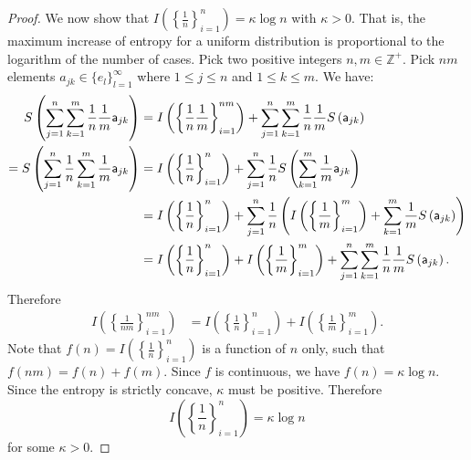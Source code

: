 \begin{proof}
	We now show that $I\left(\left\{\frac{1}{n}\right\}_{i=1}^{n}\right) = \kappa \log n$ with $\kappa > 0$. That is, the maximum increase of entropy for a uniform distribution is proportional to the logarithm of the number of cases. Pick two positive integers $n, m \in \mathbb{Z}^+$. Pick $nm$ elements $a_{jk} \in \{e_l\}_{l=1}^{\infty}$ where $1\leq j \leq n$ and $1 \leq  k \leq m$. We have:
	\begin{equation}
		\begin{aligned}
			S\left(\sum_{j=1}^{n}\sum_{k=1}^{m} \frac{1}{n}\frac{1}{m} \ens[a]_{jk}\right) &= I\left(\left\{ \frac{1}{n}\frac{1}{m}\right\}_{i=1}^{nm}\right) + \sum_{j=1}^{n}\sum_{k=1}^{m} \frac{1}{n}\frac{1}{m} S\left(\ens[a]_{jk}\right) \\
			= S\left(\sum_{j=1}^{n} \frac{1}{n} \sum_{k=1}^{m} \frac{1}{m} \ens[a]_{jk}\right)  &=I\left(\left\{ \frac{1}{n}\right\}_{i=1}^{n}\right) + \sum_{j=1}^{n} \frac{1}{n} S\left(\sum_{k=1}^{m}\frac{1}{m}\ens[a]_{jk}\right) \\
			&=I\left(\left\{ \frac{1}{n}\right\}_{i=1}^{n}\right) + \sum_{j=1}^{n} \frac{1}{n}\left(I\left(\left\{ \frac{1}{m}\right\}_{i=1}^{m}\right) +  \sum_{k=1}^{m}\frac{1}{m}S\left(\ens[a]_{jk}\right)\right) \\
			&=I\left(\left\{ \frac{1}{n}\right\}_{i=1}^{n}\right) + I\left(\left\{ \frac{1}{m}\right\}_{i=1}^{m}\right) + \sum_{j=1}^{n} \sum_{k=1}^{m}\frac{1}{n}\frac{1}{m}S\left(\ens[a]_{jk}\right).
		\end{aligned}
	\end{equation}
	Therefore
	\begin{equation}
		\begin{aligned}
			I\left(\left\{ \frac{1}{nm}\right\}_{i=1}^{nm}\right) &=I\left(\left\{ \frac{1}{n}\right\}_{i=1}^{n}\right) + I\left(\left\{ \frac{1}{m}\right\}_{i=1}^{m}\right).
		\end{aligned}
	\end{equation}
	Note that $f(n) = I\left(\left\{ \frac{1}{n}\right\}_{i=1}^{n}\right)$ is a function of $n$ only, such that $f(nm) = f(n) + f(m)$. Since $f$ is continuous, we have $f(n) = \kappa \log n$. Since the entropy is strictly concave, $\kappa$ must be positive. Therefore
	\begin{equation}
		I\left(\left\{ \frac{1}{n}\right\}_{i=1}^{n}\right) = \kappa \log n
	\end{equation}
	for some $\kappa>0$.
	

\end{proof}
